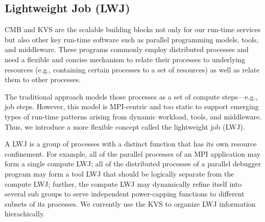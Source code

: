 \subsection{Lightweight Job (LWJ)}
CMB and KVS are the scalable building blocks not only for our run-time services 
but also other key run-time software such as parallel programming models, 
tools, and middleware. These programs commonly employ distributed processes and need a 
flexible and concise mechanism to relate their processes to underlying resources 
(e.g., containing certain processes to a set of resources) as well as relate 
them to other processes. 

The traditional approach models those processes as
a set of compute steps---e.g., job steps. However, this model 
is MPI-centric and too static to support emerging types
of run-time patterns arising from dynamic workload, tools, and middleware.
Thus, we introduce a more flexible concept called the lightweight job (LWJ).

A LWJ is a group
of processes with a distinct function that has its own resource confinement. 
For example, all of the parallel
processes of an MPI application may form a single compute LWJ; all of the distributed processes
of a parallel debugger program may form a tool LWJ that should be logically separate from the
compute LWJ; further, the compute LWJ may dynamically refine itself into several 
sub groups to serve independent power-capping functions to different subsets of its processes.
We currently use the KVS to organize LWJ information hierachically.
